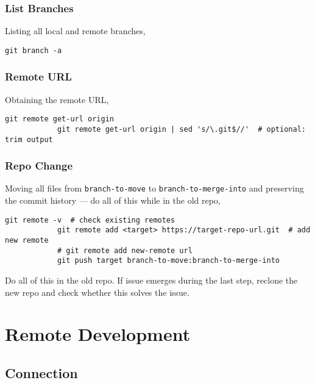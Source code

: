 \documentclass[12pt, a4paper]{article}
\numberwithin{equation}{section}
\theoremstyle{definition}
\theoremstyle{definition}
\begin{document}
	\subsubsection{List Branches}
		Listing all local and remote branches, 

		\begin{lstlisting}[style=mystylebash, label=alg:git_list_branches, xleftmargin=\parindent]
			git branch -a
		\end{lstlisting}
	
	\subsubsection{Remote URL}
		Obtaining the remote URL, 
		
		\begin{lstlisting}[style=mystylebash, label=alg:git__remote_url, xleftmargin=\parindent]
			git remote get-url origin 
			git remote get-url origin | sed 's/\.git$//'  # optional: trim output
		\end{lstlisting}
		
	\subsubsection{Repo Change}
		Moving all files from \texttt{branch-to-move} to \texttt{branch-to-merge-into} and preserving the commit history --- do all of this while in the old repo,
		
		\begin{lstlisting}[style=mystylebash, label=alg:git__remote_url, xleftmargin=\parindent]
			git remote -v  # check existing remotes
			git remote add <target> https://target-repo-url.git  # add new remote
			# git remote add new-remote url
			git push target branch-to-move:branch-to-merge-into 
		\end{lstlisting}
	
		Do all of this in the old repo. If issue emerges during the last step, reclone the new repo and check whether this solves the issue.
	
	\newpage 
	
	\section{Remote Development}
	
	\subsection{Connection}
	
\end{document}
